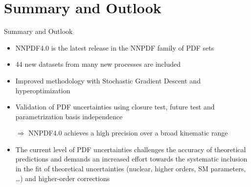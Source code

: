 \documentclass[aspectratio=169,9pt]{beamer}
\begin{document}
\section{Summary and Outlook}
\begin{frame}[t]{Summary and Outlook}
    \begin{itemize}
        \item NNPDF4.0 is the latest release in the NNPDF family of PDF sets
        \item 44 new datasets from many new processes are included
        \item Improved methodology with Stochastic Gradient Descent and hyperoptimization
        \item Validation of PDF uncertainties using closure test, future test and parametrization basis independence
        \item[$\Rightarrow$] NNPDF4.0 achieves a high precision over a broad kinematic range
    \end{itemize}
	\vspace*{1em}
    \begin{itemize}
        \item The current level of PDF uncertainties challenges the accuracy of theoretical predictions and demands an increased effort towards the systematic inclusion in the fit of theoretical uncertainties (nuclear, higher orders, SM parameters, \ldots ) and higher-order corrections
    \end{itemize}


    \vspace*{1em}
\end{frame}



\end{document}
